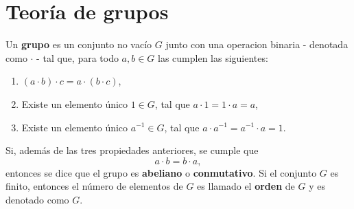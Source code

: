 \section{Teoría de grupos}
\begin{definicion}
Un \textbf{grupo} es un conjunto no vacío $G$ junto con una operacion binaria - denotada como $\cdot$ - tal que, para todo $a,b \in G$ las cumplen las siguientes:
\begin{enumerate}
\item $(a\cdot b)\cdot c = a \cdot (b\cdot c)$,
\item Existe un elemento único $1\in G$, tal que $a\cdot 1 = 1 \cdot a = a$,
\item Existe un elemento único $a^{-1} \in G$, tal que $a\cdot a^{-1} =a^{-1}\cdot a =1$.
\end{enumerate}
Si, además de las tres propiedades anteriores, se cumple que \[ a\cdot b = b \cdot a , \] entonces se dice que el grupo es \textbf{abeliano}  o \textbf{conmutativo}. 
Si el conjunto $G$ es finito, entonces el número de elementos de $G$ es llamado el \textbf{orden} de $G$ y es denotado como $G$. 
\end{definicion}
